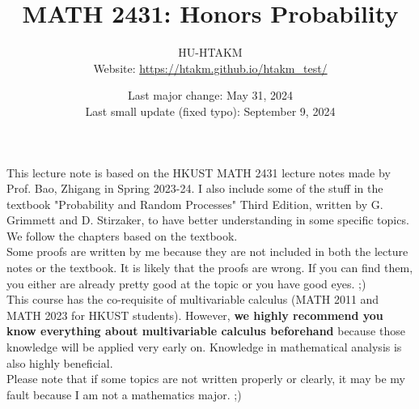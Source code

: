 \documentclass{huhtakm-template-book}
\title{MATH 2431: Honors Probability}
\author{
	HU-HTAKM\\
	Website: \url{https://htakm.github.io/htakm_test/}
}
\date{
	Last major change: May 31, 2024\\
	Last small update (fixed typo): September 9, 2024
}
\begin{document}
\maketitle
This lecture note is based on the HKUST MATH 2431 lecture notes made by Prof. Bao, Zhigang in Spring 2023-24. I also include some of the stuff in the textbook "Probability and Random Processes" Third Edition, written by G. Grimmett and D. Stirzaker, to have better understanding in some specific topics. We follow the chapters based on the textbook.\\
Some proofs are written by me because they are not included in both the lecture notes or the textbook. It is likely that the proofs are wrong. If you can find them, you either are already pretty good at the topic or you have good eyes. ;)\\
This course has the co-requisite of multivariable calculus (MATH 2011 and MATH 2023 for HKUST students). However, \textbf{we highly recommend you know everything about multivariable calculus beforehand} because those knowledge will be applied very early on. Knowledge in mathematical analysis is also highly beneficial.\\
Please note that if some topics are not written properly or clearly, it may be my fault because I am not a mathematics major. ;)
\end{document}
